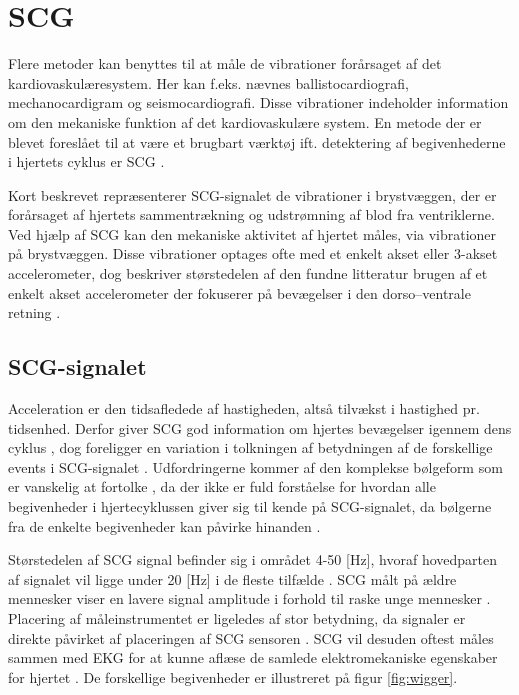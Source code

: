 \newpage
\section{SCG}
Flere metoder kan benyttes til at måle de vibrationer forårsaget af det kardiovaskulæresystem. Her kan f.eks. nævnes ballistocardiografi, mechanocardigram og seismocardiografi. Disse vibrationer indeholder information om den mekaniske funktion af det kardiovaskulære system. En metode der er blevet foreslået til at være et brugbart værktøj ift. detektering af begivenhederne i hjertets cyklus er SCG \cite{phd}. 

Kort beskrevet repræsenterer SCG-signalet de vibrationer i brystvæggen, der er forårsaget af hjertets sammentrækning og udstrømning af blod fra ventriklerne. Ved hjælp af  SCG kan den mekaniske aktivitet af hjertet måles, via vibrationer på brystvæggen. Disse vibrationer optages ofte med et enkelt akset eller 3-akset accelerometer, dog beskriver størstedelen af den fundne litteratur  brugen af et enkelt akset accelerometer der fokuserer på bevægelser i den dorso–ventrale retning \cite{Recent_Advances}.

\subsection{SCG-signalet}
Acceleration er den tidsafledede af hastigheden, altså tilvækst i hastighed pr. tidsenhed. Derfor giver SCG god information om hjertes bevægelser igennem dens cyklus \cite{performance}, dog  foreligger en variation i tolkningen af betydningen af de forskellige events i SCG-signalet \cite{phd}. Udfordringerne kommer af den komplekse bølgeform som er vanskelig at fortolke \cite{zanetti}, da der ikke er fuld forståelse for hvordan alle begivenheder i hjertecyklussen giver sig til kende på SCG-signalet, da bølgerne fra de enkelte begivenheder kan påvirke hinanden \cite{abra}.

Størstedelen af SCG signal befinder sig i området 4-50 [Hz], hvoraf hovedparten af signalet vil ligge under 20 [Hz] i de fleste tilfælde \cite{phd}. 
SCG målt på ældre mennesker viser en lavere signal amplitude i forhold til raske unge mennesker \cite{Recent_Advances}. Placering af måleinstrumentet er ligeledes af stor betydning, da signaler er direkte påvirket af placeringen af SCG sensoren \cite{zanetti}. SCG vil desuden oftest måles sammen med EKG for at kunne aflæse de samlede elektromekaniske egenskaber for hjertet \cite{abra}. De forskellige begivenheder er illustreret på figur \ref{fig:wigger}.


